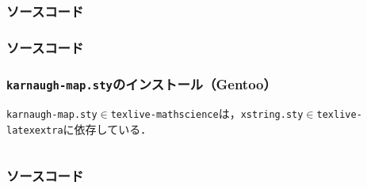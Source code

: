\documentclass[dvipdfmx,uplatex,a4j,12pt]{beamer}
\newcommand\putsource[1]{
    \begin{frame}
        \frametitle{ソースコード}

        
    \end{frame}
}
\newcommand\generateslides[1]{
    
    \putsource{#1.tex}
}
\begin{document}
\generateslides{image}
\generateslides{karnaugh-map}

\begin{frame}[fragile]
    \frametitle{\lstinline{karnaugh-map.sty}のインストール（Gentoo）}

    \lstinline{karnaugh-map.sty}$\in$\lstinline{texlive-mathscience}は，\lstinline{xstring.sty}$\in$\lstinline{texlive-latexextra}に依存している．

    \begin{lstlisting}[language={sh}, caption=\lstinline{e-file}]
%sudo emerge -avt texlive-mathscience texlive-latexextra
    \end{lstlisting}
\end{frame}

\generateslides{bib}
\end{document}
